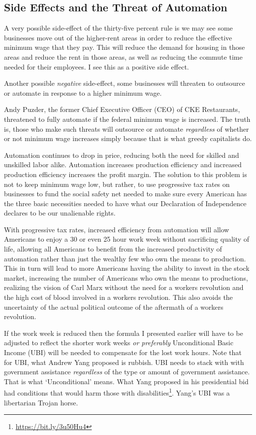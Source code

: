 \subsection{Side Effects and the Threat of Automation}

A very possible side-effect of the thirty-five percent rule is we may see some businesses move out of the higher-rent areas in order to reduce the effective minimum wage that they pay. This will reduce the demand for housing in those areas and reduce the rent in those areas, as well as reducing the commute time needed for their employees. I see this as a positive side effect.

Another possible \emph{negative} side-effect, some businesses will threaten to outsource or automate in response to a higher minimum wage.

Andy Puzder, the former Chief Executive Officer (CEO) of CKE Restaurants, threatened to fully automate if the federal minimum wage is increased. The truth is, those who make such threats will outsource or automate \emph{regardless} of whether or not minimum wage increases simply because that is what greedy capitalists do.

Automation continues to drop in price, reducing both the need for skilled and unskilled labor alike. Automation increases production efficiency and increased production efficiency increases the profit margin. The solution to this problem is not to keep minimum wage low, but rather, to use progressive tax rates on businesses to fund the social safety net needed to make sure every American has the three basic necessities needed to have what our Declaration of Independence declares to be our unalienable rights.

With progressive tax rates, increased efficiency from automation will allow Americans to enjoy a 30 or even 25 hour work week without sacrificing quality of life, allowing all Americans to benefit from the increased productivity of automation rather than just the wealthy few who own the means to production. This in turn will lead to more Americans having the ability to invest in the stock market, increasing the number of Americans who own the means to productions, realizing the vision of Carl Marx without the need for a workers revolution and the high cost of blood involved in a workers revolution. This also avoids the uncertainty of the actual political outcome of the aftermath of a workers revolution.

If the work week is reduced then the formula I presented earlier will have to be adjusted to reflect the shorter work weeks \emph{or preferably} Unconditional Basic Income (UBI) will be needed to compensate for the lost work hours. Note that for UBI, what Andrew Yang proposed is rubbish. UBI needs to stack with with government assistance \emph{regardless} of the type or amount of government assistance. That is what `Unconditional' means. What Yang proposed in his presidential bid had conditions that would harm those with disabilities\footnote{\url{https://bit.ly/3u50Hu4}}. Yang's UBI was a libertarian Trojan horse.

